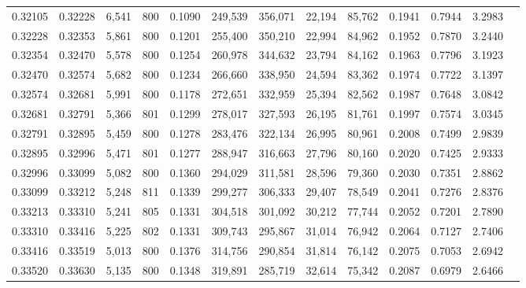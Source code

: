 \begin{tabular}{rrrrrrrrrrrrr}
0.32105 & 0.32228 &  6,541 & 800 &                                     0.1090 & 249,539 & 356,071 &  22,194 &  85,762 & 0.1941 & 0.7944 & 3.2983 \\
0.32228 & 0.32353 &  5,861 & 800 &                                     0.1201 & 255,400 & 350,210 &  22,994 &  84,962 & 0.1952 & 0.7870 & 3.2440 \\
0.32354 & 0.32470 &  5,578 & 800 &                                     0.1254 & 260,978 & 344,632 &  23,794 &  84,162 & 0.1963 & 0.7796 & 3.1923 \\
0.32470 & 0.32574 &  5,682 & 800 &                                     0.1234 & 266,660 & 338,950 &  24,594 &  83,362 & 0.1974 & 0.7722 & 3.1397 \\
0.32574 & 0.32681 &  5,991 & 800 &                                     0.1178 & 272,651 & 332,959 &  25,394 &  82,562 & 0.1987 & 0.7648 & 3.0842 \\
0.32681 & 0.32791 &  5,366 & 801 &                                     0.1299 & 278,017 & 327,593 &  26,195 &  81,761 & 0.1997 & 0.7574 & 3.0345 \\
0.32791 & 0.32895 &  5,459 & 800 &                                     0.1278 & 283,476 & 322,134 &  26,995 &  80,961 & 0.2008 & 0.7499 & 2.9839 \\
0.32895 & 0.32996 &  5,471 & 801 &                                     0.1277 & 288,947 & 316,663 &  27,796 &  80,160 & 0.2020 & 0.7425 & 2.9333 \\
0.32996 & 0.33099 &  5,082 & 800 &                                     0.1360 & 294,029 & 311,581 &  28,596 &  79,360 & 0.2030 & 0.7351 & 2.8862 \\
0.33099 & 0.33212 &  5,248 & 811 &                                     0.1339 & 299,277 & 306,333 &  29,407 &  78,549 & 0.2041 & 0.7276 & 2.8376 \\
0.33213 & 0.33310 &  5,241 & 805 &                                     0.1331 & 304,518 & 301,092 &  30,212 &  77,744 & 0.2052 & 0.7201 & 2.7890 \\
0.33310 & 0.33416 &  5,225 & 802 &                                     0.1331 & 309,743 & 295,867 &  31,014 &  76,942 & 0.2064 & 0.7127 & 2.7406 \\
0.33416 & 0.33519 &  5,013 & 800 &                                     0.1376 & 314,756 & 290,854 &  31,814 &  76,142 & 0.2075 & 0.7053 & 2.6942 \\
0.33520 & 0.33630 &  5,135 & 800 &                                     0.1348 & 319,891 & 285,719 &  32,614 &  75,342 & 0.2087 & 0.6979 & 2.6466 \\

\end{tabular}
